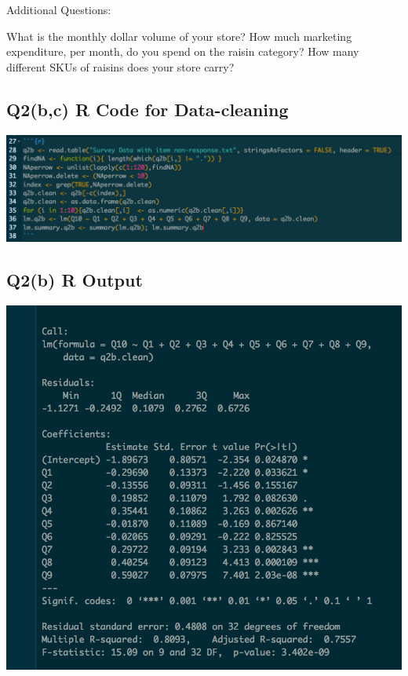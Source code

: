 \documentclass[10pt, oneside,spanish]{article}
\begin{document}
Additional Questions: 

What is the monthly dollar volume of your store?
How much marketing expenditure, per month, do you spend on the raisin category?
How many different SKUs of raisins does your store carry?

\pagebreak

\subsection{Q2(b,c) R Code for Data-cleaning }



\begin{center}
\includegraphics[width=16cm]{q2bcode.png}
\end{center}



\subsection{Q2(b) R Output }
\begin{center}
\includegraphics[width=14cm]{q2b.png}
\end{center}
\end{document}
